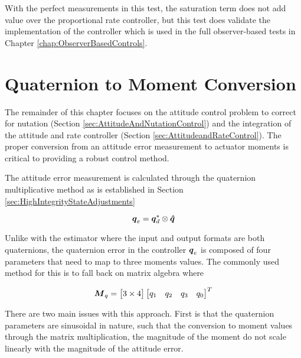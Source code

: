 With the perfect measurements in this test, the saturation term does not add value over the proportional rate controller, but this test does validate the implementation of the controller which is used in the full observer-based tests in Chapter \ref{chap:ObserverBasedControls}.

\section{Quaternion to Moment Conversion}
\label{sec:QuaternionToMomentConversion}

The remainder of this chapter focuses on the attitude control problem to correct for nutation (Section \ref{sec:AttitudeAndNutationControl}) and the integration of the attitude and rate controller (Section \ref{sec:AttitudeandRateControl}).  The proper conversion from an attitude error measurement to actuator moments is critical to providing a robust control method.

The attitude error measurement is calculated through the quaternion multiplicative method as is established in Section \ref{sec:HighIntegrityStateAdjustments}

\begin{equation}
  \boldsymbol{q}_e = \boldsymbol{q}_d^* \otimes \boldsymbol{\hat{q}}
\end{equation}

Unlike with the estimator where the input and output formats are both quaternions, the quaternion error in the controller $\boldsymbol{q}_e$ is composed of four parameters that need to map to three moments values.  The commonly used method for this is to fall back on matrix algebra where

\begin{equation}
  \boldsymbol{M}_q = \begin{bmatrix} 3 \times 4 \end{bmatrix} \begin{bmatrix} q_1 & q_2 & q_3 & q_0 \end{bmatrix}^T
  \label{eqn:traditional_attitude_controller}
\end{equation}

There are two main issues with this approach.  First is that the quaternion parameters are sinusoidal in nature, such that the conversion to moment values through the matrix multiplication, the magnitude of the moment do not scale linearly with the magnitude of the attitude error.

